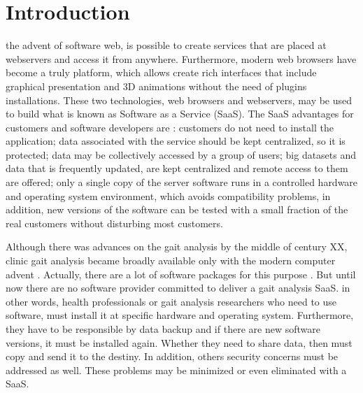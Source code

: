 \documentclass[journal]{IEEEtran}
\begin{document}
%
\IEEEpeerreviewmaketitle



\section{Introduction}
% 
% 
% 
% 
 the advent of software web, is possible to create services
that are placed at webservers and access it  from anywhere.
Furthermore, modern web browsers have become a truly platform, which allows
create rich interfaces that include graphical presentation and 3D animations
without the need of plugins installations.
These two technologies, web browsers and webservers, may be used to build
what is known as Software as a Service (SaaS). The SaaS advantages for 
customers and software developers are \cite{Fox2012}: customers do not need
to install the application; data associated with the service should be kept centralized,
so it is protected; data may be collectively accessed by a group of users;
big datasets and data that is frequently updated, are kept centralized 
and remote access to them are offered; only a single copy of the server software
runs in a controlled hardware and operating system environment, which avoids
compatibility problems, in addition, new versions of the software can be 
tested with a small fraction of the real customers without disturbing most
customers.

Although there was advances on the gait analysis by the middle of century XX, 
clinic gait analysis became broadly available only
with the modern computer advent \cite{Baker2007}.
Actually, there are a lot of software packages for this purpose \cite{Moraes2003}.
But until now there are no software provider committed to deliver a 
gait analysis SaaS. in other words, health professionals or gait analysis researchers
who need to use software, must install it at specific hardware and
operating system. Furthermore, they have to be responsible by data backup and if there are
new software versions, it must be installed again. Whether they
need to share data, then must copy and send it to the destiny. In addition, others
security concerns must be addressed as well.
These problems may be minimized or even eliminated with a SaaS.
\end{document}
